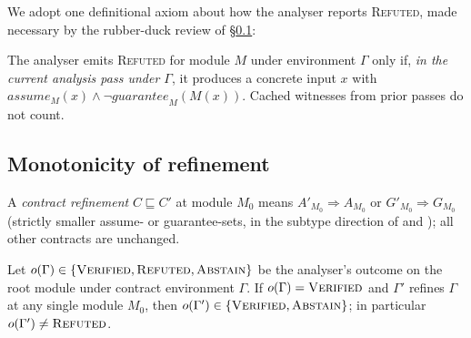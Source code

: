 We adopt one definitional axiom about how the analyser reports
\textsc{Refuted}, made necessary by the rubber-duck review of
\S\ref{sec:ag:monotonicity}:

\begin{axiom}
\label{ax:refuted}
The analyser emits \textsc{Refuted} for module $M$ under environment
$\Gamma$ only if, \emph{in the current analysis pass under $\Gamma$},
it produces a concrete input $x$ with
$\mathit{assume}_M(x) \wedge \neg\mathit{guarantee}_M(M(x))$.
Cached witnesses from prior passes do not count.
\end{axiom}

\subsection{Monotonicity of refinement}
\label{sec:ag:monotonicity}

A \emph{contract refinement} $C\sqsubseteq C'$ at module $M_0$ means
$A'_{M_0}\!\Rightarrow\!A_{M_0}$ or $G'_{M_0}\!\Rightarrow\!G_{M_0}$
(strictly smaller assume- or guarantee-sets, in the subtype direction
of \citet{vazou2014refinement} and \citet{swamy2016dependent}); all
other contracts are unchanged.

\begin{theorem}[Monotonicity]
\label{thm:monotonicity}
Let $o(\Gamma)\in\{\textsc{Verified},\textsc{Refuted},\textsc{Abstain}\}$
be the analyser's outcome on the root module under contract environment
$\Gamma$. If $o(\Gamma)=\textsc{Verified}$ and $\Gamma'$ refines
$\Gamma$ at any single module $M_0$, then
$o(\Gamma')\in\{\textsc{Verified},\textsc{Abstain}\}$;
in particular $o(\Gamma')\neq\textsc{Refuted}$.
\end{theorem}

